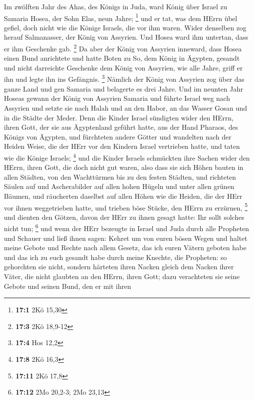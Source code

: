  Im zwölften Jahr des Ahas, des Königs in Juda, ward König
über Israel zu Samaria Hosea, der Sohn Elas, neun Jahre; \footnote{\textbf{17:1}
  2Kö 15,30}  und er tat, was dem HErrn übel gefiel, doch
nicht wie die Könige Israels, die vor ihm waren.  Wider
denselben zog herauf Salmanasser, der König von Assyrien. Und Hosea ward
ihm untertan, dass er ihm Geschenke gab. \footnote{\textbf{17:3} 2Kö
  18,9-12}  Da aber der König von Assyrien inneward, dass
Hosea einen Bund anrichtete und hatte Boten zu So, dem König in Ägypten,
gesandt und nicht darreichte Geschenke dem König von Assyrien, wie alle
Jahre, griff er ihn und legte ihn ins Gefängnis. \footnote{\textbf{17:4}
  Hos 12,2}  Nämlich der König von Assyrien zog über das
ganze Land und gen Samaria und belagerte es drei Jahre.  Und
im neunten Jahr Hoseas gewann der König von Assyrien Samaria und führte
Israel weg nach Assyrien und setzte sie nach Halah und an den Habor, an
das Wasser Gosan und in die Städte der Meder.  Denn die
Kinder Israel sündigten wider den HErrn, ihren Gott, der sie aus
Ägyptenland geführt hatte, aus der Hand Pharaos, des Königs von Ägypten,
und fürchteten andere Götter  und wandelten nach der Heiden
Weise, die der HErr vor den Kindern Israel vertrieben hatte, und taten
wie die Könige Israels; \footnote{\textbf{17:8} 2Kö 16,3} 
und die Kinder Israels schmückten ihre Sachen wider den HErrn, ihren
Gott, die doch nicht gut waren, also dass sie sich Höhen bauten in allen
Städten, von den Wachttürmen bis zu den festen Städten, 
und richteten Säulen auf und Ascherabilder auf allen hohen Hügeln und
unter allen grünen Bäumen,  und räucherten daselbst auf
allen Höhen wie die Heiden, die der HErr vor ihnen weggetrieben hatte,
und trieben böse Stücke, den HErrn zu erzürnen, \footnote{\textbf{17:11}
  2Kö 17,8}  und dienten den Götzen, davon der HErr zu
ihnen gesagt hatte: Ihr sollt solches nicht tun; \footnote{\textbf{17:12}
  2Mo 20,2-3; 2Mo 23,13}  und wenn der HErr bezeugte in
Israel und Juda durch alle Propheten und Schauer und ließ ihnen sagen:
Kehret um von euren bösen Wegen und haltet meine Gebote und Rechte nach
allem Gesetz, das ich euren Vätern geboten habe und das ich zu euch
gesandt habe durch meine Knechte, die Propheten:  so
gehorchten sie nicht, sondern härteten ihren Nacken gleich dem Nacken
ihrer Väter, die nicht glaubten an den HErrn, ihren Gott; 
dazu verachteten sie seine Gebote und seinen Bund, den er mit ihren
